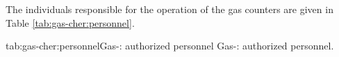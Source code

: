 The individuals responsible for the operation 
of the gas \Cherenkov{} counters are given in Table \ref{tab:gas-cher:personnel}.

\begin{namestab}{tab:gas-cher:personnel}{Gas-\Cherenkov{}: authorized personnel}{%
      Gas-\Cherenkov{}: authorized personnel.}
  \JackSegal{}
\end{namestab}

%
%







